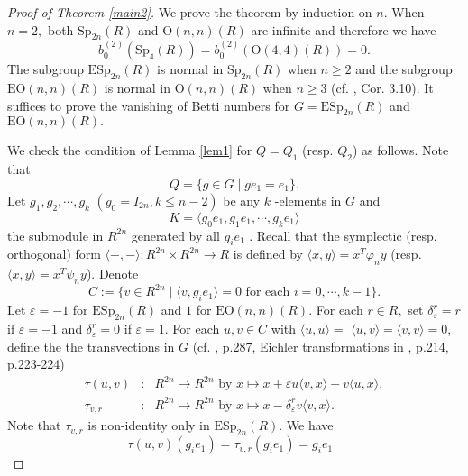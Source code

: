 \documentclass{gtpart}     %
\begin{document}
\begin{proof}[Proof of Theorem \protect\ref{main2}]
We prove the theorem by induction on $n.$ When $n=2,$ both $\mathrm{Sp}%
_{2n}(R)$ and $\mathrm{O}(n,n)(R)$ are infinite and therefore we have $$%
b_{0}^{(2)}(\mathrm{Sp}_{4}(R))=b_{0}^{(2)}(\mathrm{O}(4,4)(R))=0.$$ The
subgroup $\mathrm{ESp}_{2n}(R)$ is normal in $\mathrm{Sp}_{2n}(R)$ when $%
n\geq 2$ and the subgroup $\mathrm{EO}(n,n)(R)$ is normal in $\mathrm{O}%
(n,n)(R)$ when $n\geq 3$ (cf. \cite{ba}, Cor. 3.10). It suffices to prove
the vanishing of Betti numbers for $G=\mathrm{ESp}_{2n}(R)$ and $\mathrm{EO}%
(n,n)(R).$

We check the condition of Lemma \ref{lem1} for $Q=Q_{1}$ (resp. $Q_{2}$) as
follows. Note that
\begin{equation*}
Q=\{g\in G\mid ge_{1}=e_{1}\}.
\end{equation*}%
Let $g_{1},g_{2},\cdots ,g_{k}$ $(g_{0}=I_{2n},k\leq n-2)$ be any $k$%
-elements in $G$ and $$K=\langle g_{0}e_{1},g_{1}e_{1},\cdots
,g_{k}e_{1}\rangle $$ the submodule in $R^{2n}$ generated by all $g_{i}e_{1}$%
. Recall that the symplectic (resp. orthogonal) form $\langle -,-\rangle
:R^{2n}\times R^{2n}\rightarrow R$ is defined by $\langle x,y\rangle
=x^{T}\varphi _{n}y$ (resp. $\langle x,y\rangle =x^{T}\psi _{n}y$). Denote
\begin{equation*}
C:=\{v\in R^{2n}\mid \langle v,g_{i}e_{1}\rangle =0\text{ for each }%
i=0,\cdots ,k-1\}.
\end{equation*}%
Let $\varepsilon =-1$ for $\mathrm{ESp}_{2n}(R)$ and $1$ for $\mathrm{EO}%
(n,n)(R)$. For each $r\in R,$ set $\delta _{\varepsilon }^{r}=r$ if $%
\varepsilon =-1$ and $\delta _{\varepsilon }^{r}=0$ if $\varepsilon =1.$ For
each $u,v\in C$ with $\langle u,u\rangle =$ $\langle u,v\rangle =\langle
v,v\rangle =0$, define the the transvections in $G$ (cf. \cite{va}, p.287,
Eichler transformations in \cite{M}, p.214, p.223-224)
\begin{eqnarray*}
\tau (u,v) &:&R^{2n}\rightarrow R^{2n}\text{ by }x\mapsto x+\varepsilon
u\langle v,x\rangle -v\langle u,x\rangle , \\
\tau _{v,r} &:&R^{2n}\rightarrow R^{2n}\text{ by }x\mapsto x-\delta
_{\varepsilon }^{r}v\langle v,x\rangle .
\end{eqnarray*}%
Note that $\tau _{v,r}$ is non-identity only in $\mathrm{ESp}_{2n}(R).$ We
have
\begin{equation*}
\tau (u,v)(g_{i}e_{1})=\tau _{v,r}(g_{i}e_{1})=g_{i}e_{1}\text{ }
\end{equation*}%

\end{proof}
\end{document}
